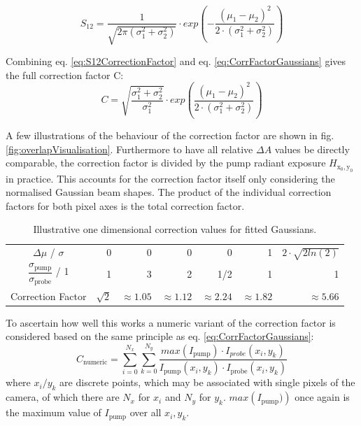 \documentclass[twoside,openright,listof=numbered]{scrreprt}
\def\radiantExp{\ensuremath{H_\mathrm{x_0,y_0}}}
\begin{document}
\begin{equation}\label{eq:S12CorrectionFactor}
S_{12} = \dfrac{1}{\sqrt{2\pi\left(\sigma_1^2+\sigma_2^2\right)}}\cdot exp\left(-\dfrac{\left(\mu_1 - \mu_2\right)^2}{2\cdot \left(\sigma_1^2+\sigma_2^2\right)}\right)
\end{equation}

Combining eq. \ref{eq:S12CorrectionFactor} and eq. \ref{eq:CorrFactorGaussians} gives the full correction factor C:
\begin{equation}\label{eq:fullCorrectionFactor}
C = \sqrt{\frac{\sigma_1^2+\sigma_2^2}{\sigma_1^2}}\cdot exp \left(\frac{\left(\mu_1-\mu_2\right)^2}{2\cdot \left(\sigma_1^2+\sigma_2^2\right)}\right)
\end{equation}

A few illustrations of the behaviour of the correction factor are shown in fig. \ref{fig:overlapVisualisation}. Furthermore to have all relative $\Delta A$ values be directly comparable, the correction factor is divided by the pump radiant exposure $\radiantExp$ in practice. This accounts for the correction factor itself only considering the normalised Gaussian beam shapes. The product of the individual correction factors for both pixel axes is the total correction factor.

\begin{table}[h]
\caption{Illustrative one dimensional correction values for fitted Gaussians.}
\centering
\begin{tabular}{c|rrrrrr}\toprule
$\Delta \mu$ / $\sigma$                     & 0          & 0             & 0              & 0             & 1              & $2\cdot\sqrt{2 ln(2)}$ \\
$\dfrac{\sigma_\text{pump}}{\sigma_\text{probe}}$ / 1 & 1          & 3             & 2              & 1/2           & 1              & 1                      \\
Correction Factor                           & $\sqrt{2}$ & $\approx1.05$ & $\approx 1.12$ & $\approx 2.24$ & $\approx 1.82$ & $\approx 5.66$ \\ \bottomrule       
\end{tabular}
\end{table}


To ascertain how well this works a numeric variant of the correction factor is considered based on the same principle as eq. \ref{eq:CorrFactorGaussians}:
\begin{equation}\label{eq:correctionNumeric}
C_\text{numeric} = \sum_{i=0}^{N_x}\sum_{k=0}^{N_y}\frac{max\left(I_\text{pump}\right)\cdot I_{probe}(x_i,y_k)}{I_\text{pump}(x_i,y_k)\cdot I_\text{probe}(x_i,y_k)}
\end{equation}
where ${x_i/y_k}$ are discrete points, which may be associated with single pixels of the camera, of which there are $N_x$ for $x_i$ and $N_y$ for $y_k$. $max\left(I_\text{pump})\right)$ once again is the maximum value of ${I_\text{pump}}$ over all ${x_i, y_k}$. 
\end{document}
